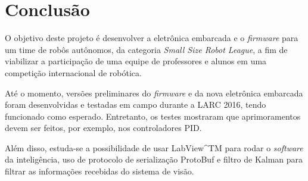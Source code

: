 \chapter{Conclusão}\label{cap:conclusao}

%
%
%
%


O objetivo deste projeto é desenvolver a eletrônica embarcada e o \textit{firmware} para um time de robôs autônomos, da categoria \textit{Small Size Robot League}, a fim de viabilizar a participação de uma equipe de professores e alunos em uma competição internacional de robótica.

Até o momento, versões preliminares do \textit{firmware} e da nova eletrônica embarcada foram desenvolvidas e testadas em campo durante a LARC 2016, tendo funcionado como esperado. Entretanto, os testes mostraram que aprimoramentos devem ser feitos, por exemplo, nos controladores PID.

Além disso, estuda-se a possibilidade de usar LabView^{TM} para rodar o \textit{software} da inteligência, uso de protocolo de serialização ProtoBuf\cite{protobufdocs} e filtro de Kalman para filtrar as informações recebidas do sistema de visão. 

